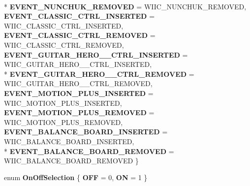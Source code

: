 \begin{DoxyCompactItemize}
\\*
{\bfseries E\-V\-E\-N\-T\-\_\-\-N\-U\-N\-C\-H\-U\-K\-\_\-\-R\-E\-M\-O\-V\-E\-D} =  W\-I\-I\-C\-\_\-\-N\-U\-N\-C\-H\-U\-K\-\_\-\-R\-E\-M\-O\-V\-E\-D, 
{\bfseries E\-V\-E\-N\-T\-\_\-\-C\-L\-A\-S\-S\-I\-C\-\_\-\-C\-T\-R\-L\-\_\-\-I\-N\-S\-E\-R\-T\-E\-D} =  W\-I\-I\-C\-\_\-\-C\-L\-A\-S\-S\-I\-C\-\_\-\-C\-T\-R\-L\-\_\-\-I\-N\-S\-E\-R\-T\-E\-D, 
{\bfseries E\-V\-E\-N\-T\-\_\-\-C\-L\-A\-S\-S\-I\-C\-\_\-\-C\-T\-R\-L\-\_\-\-R\-E\-M\-O\-V\-E\-D} =  W\-I\-I\-C\-\_\-\-C\-L\-A\-S\-S\-I\-C\-\_\-\-C\-T\-R\-L\-\_\-\-R\-E\-M\-O\-V\-E\-D, 
{\bfseries E\-V\-E\-N\-T\-\_\-\-G\-U\-I\-T\-A\-R\-\_\-\-H\-E\-R\-O\-\_\-\_\-\-C\-T\-R\-L\-\_\-\-I\-N\-S\-E\-R\-T\-E\-D} =  W\-I\-I\-C\-\_\-\-G\-U\-I\-T\-A\-R\-\_\-\-H\-E\-R\-O\-\_\-\_\-\-C\-T\-R\-L\-\_\-\-I\-N\-S\-E\-R\-T\-E\-D, 
\\*
{\bfseries E\-V\-E\-N\-T\-\_\-\-G\-U\-I\-T\-A\-R\-\_\-\-H\-E\-R\-O\-\_\-\_\-\-C\-T\-R\-L\-\_\-\-R\-E\-M\-O\-V\-E\-D} =  W\-I\-I\-C\-\_\-\-G\-U\-I\-T\-A\-R\-\_\-\-H\-E\-R\-O\-\_\-\_\-\-C\-T\-R\-L\-\_\-\-R\-E\-M\-O\-V\-E\-D, 
{\bfseries E\-V\-E\-N\-T\-\_\-\-M\-O\-T\-I\-O\-N\-\_\-\-P\-L\-U\-S\-\_\-\-I\-N\-S\-E\-R\-T\-E\-D} =  W\-I\-I\-C\-\_\-\-M\-O\-T\-I\-O\-N\-\_\-\-P\-L\-U\-S\-\_\-\-I\-N\-S\-E\-R\-T\-E\-D, 
{\bfseries E\-V\-E\-N\-T\-\_\-\-M\-O\-T\-I\-O\-N\-\_\-\-P\-L\-U\-S\-\_\-\-R\-E\-M\-O\-V\-E\-D} =  W\-I\-I\-C\-\_\-\-M\-O\-T\-I\-O\-N\-\_\-\-P\-L\-U\-S\-\_\-\-R\-E\-M\-O\-V\-E\-D, 
{\bfseries E\-V\-E\-N\-T\-\_\-\-B\-A\-L\-A\-N\-C\-E\-\_\-\-B\-O\-A\-R\-D\-\_\-\-I\-N\-S\-E\-R\-T\-E\-D} =  W\-I\-I\-C\-\_\-\-B\-A\-L\-A\-N\-C\-E\-\_\-\-B\-O\-A\-R\-D\-\_\-\-I\-N\-S\-E\-R\-T\-E\-D, 
\\*
{\bfseries E\-V\-E\-N\-T\-\_\-\-B\-A\-L\-A\-N\-C\-E\-\_\-\-B\-O\-A\-R\-D\-\_\-\-R\-E\-M\-O\-V\-E\-D} =  W\-I\-I\-C\-\_\-\-B\-A\-L\-A\-N\-C\-E\-\_\-\-B\-O\-A\-R\-D\-\_\-\-R\-E\-M\-O\-V\-E\-D
 \}
\item 
enum {\bfseries On\-Off\-Selection} \{ {\bfseries O\-F\-F} =  0, 
{\bfseries O\-N} =  1
 \}
\end{DoxyCompactItemize}
